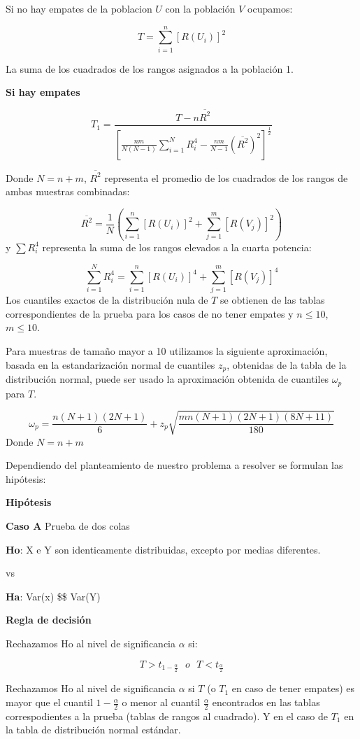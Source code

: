 \documentclass[a4paper,oneside,openany]{book}
\begin{document}
Si no hay empates de la poblacion \(U\) con la población \(V\) ocupamos:

\[T=\sum_{i=1}^{n}[R(U_{i})]^2\]

La suma de los cuadrados de los rangos asignados a la población 1.

\textbf{Si hay empates}

\[T_{1} = \frac{T-n\overline{R^2}}{\left[\frac{nm}{N(N-1)}\sum_{i=1}^{N}R_{i}^4-\frac{nm}{N-1}(\overline{R^2})^2\right]^\frac{1}{2}}\]

Donde \(N= n+m\), \(\overline{R^2}\) representa el promedio de los
cuadrados de los rangos de ambas muestras combinadas:

\[\overline{R^2}= \frac{1}{N}\left(\sum_{i=1}^{n}[R(U_{i})]^2+\sum_{j=1}^{m}[R(V_{j})]^2\right)\]
y \(\sum R_{i}^4\) representa la suma de los rangos elevados a la cuarta
potencia:

\[ \sum_{i=1}^{N}R_{i}^4= \sum_{i=1}^{n}[R(U_{i})]^4+\sum_{j=1}^{m}[R(V_{j})]^4\]
Los cuantiles exactos de la distribución nula de \(T\) se obtienen de
las tablas correspondientes de la prueba para los casos de no tener
empates y \(n\leq10\), \(m\leq10\).

Para muestras de tamaño mayor a 10 utilizamos la siguiente aproximación,
basada en la estandarización normal de cuantiles \(z_p\), obtenidas de
la tabla de la distribución normal, puede ser usado la aproximación
obtenida de cuantiles \(\omega_p\) para \(T\).

\[\omega_p= \frac{n(N+1)(2N+1)}{6}+z_{p}\sqrt{\frac{mn(N+1)(2N+1)(8N+11)}{180}}\]
Donde \(N= n+m\)

Dependiendo del planteamiento de nuestro problema a resolver se formulan
las hipótesis:

\textbf{Hipótesis}

\textbf{Caso A} Prueba de dos colas

\textbf{Ho}: X e Y son identicamente distribuidas, excepto por medias
diferentes.

vs

\textbf{Ha}: Var(x) \$\neq \$ Var(Y)

\textbf{Regla de decisión}

Rechazamos Ho al nivel de significancia \(\alpha\) si:

\[T>t_{1-\frac{\alpha}{2}} \ \ \   o \ \ \  T<t_{\frac{\alpha}{2}}\]

Rechazamos Ho al nivel de significancia \(\alpha\) si \(T\) (o \(T_1\)
en caso de tener empates) es mayor que el cuantil \(1-\frac{\alpha}{2}\)
o menor al cuantil \(\frac{\alpha}{2}\) encontrados en las tablas
correspodientes a la prueba (tablas de rangos al cuadrado). Y en el caso
de \(T_{1}\) en la tabla de distribución normal estándar.
\end{document}
